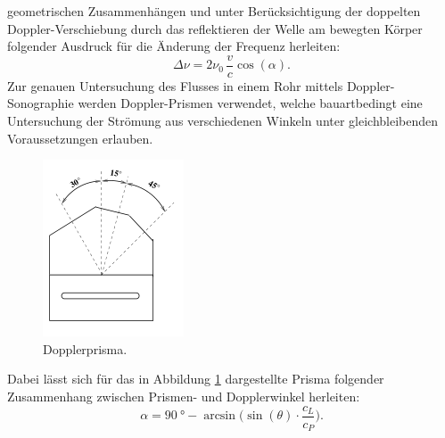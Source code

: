geometrischen Zusammenhängen und unter Berücksichtigung der doppelten Doppler-Verschiebung durch das reflektieren der Welle am bewegten Körper folgender Ausdruck für die Änderung der Frequenz
herleiten:
\begin{equation}
  \Delta\nu = 2 \nu_0\, \frac{v}{c} \cos(\alpha) .
  \label{eqn:deltanu}
\end{equation}
Zur genauen Untersuchung des Flusses in einem Rohr mittels Doppler-Sonographie werden Doppler-Prismen verwendet, welche bauartbedingt eine Untersuchung der Strömung aus verschiedenen Winkeln
unter gleichbleibenden Voraussetzungen erlauben.
\begin{figure}
  \centering
  \includegraphics{images/prisma.png}
  \caption{Dopplerprisma.\cite{sample}}
  \label{fig:prisma}
\end{figure}
Dabei lässt sich für das in Abbildung \ref{fig:prisma} dargestellte Prisma folgender Zusammenhang zwischen Prismen- und Dopplerwinkel herleiten:
\begin{equation}
  \alpha = \SI{90}{\degree} - \arcsin\bigl(\sin(\theta)\cdot\frac{c_L}{c_P}\bigr) .
\end{equation}
